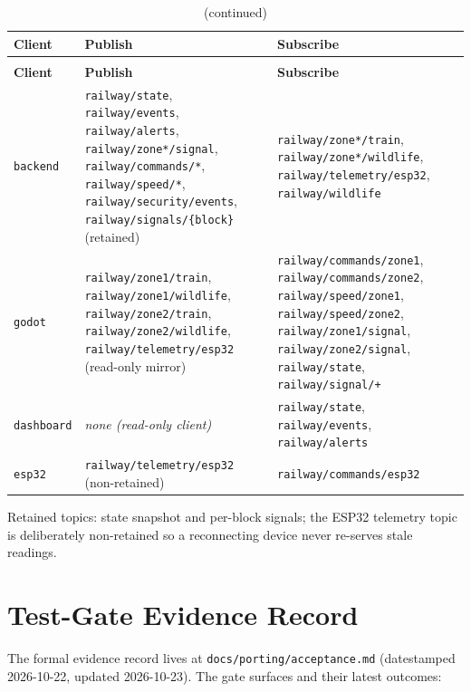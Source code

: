 \begin{longtable}{>{\raggedright}p{2.2cm} >{\raggedright\arraybackslash}p{6.6cm} >{\raggedright\arraybackslash}p{6.6cm}}
\caption{Per-client publish/subscribe matrix}\label{tab:acl-matrix}\\
\toprule
\textbf{Client} & \textbf{Publish} & \textbf{Subscribe} \\
\midrule
\endfirsthead
\caption[]{(continued)}\\
\toprule
\textbf{Client} & \textbf{Publish} & \textbf{Subscribe} \\
\midrule
\endhead
\texttt{backend} & \texttt{railway/state}, \texttt{railway/events},
\texttt{railway/alerts}, \texttt{railway/zone*/signal},
\texttt{railway/commands/*}, \texttt{railway/speed/*},
\texttt{railway/security/events}, \texttt{railway/signals/\{block\}}
(retained) & \texttt{railway/zone*/train},
\texttt{railway/zone*/wildlife}, \texttt{railway/telemetry/esp32},
\texttt{railway/wildlife} \\
\texttt{godot} & \texttt{railway/zone1/train},
\texttt{railway/zone1/wildlife}, \texttt{railway/zone2/train},
\texttt{railway/zone2/wildlife}, \texttt{railway/telemetry/esp32}
{\scriptsize(read-only mirror)} & \texttt{railway/commands/zone1},
\texttt{railway/commands/zone2}, \texttt{railway/speed/zone1},
\texttt{railway/speed/zone2}, \texttt{railway/zone1/signal},
\texttt{railway/zone2/signal}, \texttt{railway/state},
\texttt{railway/signal/+} \\
\texttt{dashboard} & {\em none (read-only client)} &
\texttt{railway/state}, \texttt{railway/events},
\texttt{railway/alerts} \\
\texttt{esp32} & \texttt{railway/telemetry/esp32} (non-retained) &
\texttt{railway/commands/esp32} \\
\bottomrule
\end{longtable}

\noindent Retained topics: state snapshot and per-block signals; the
ESP32 telemetry topic is deliberately non-retained so a reconnecting
device never re-serves stale readings.

\chapter{Test-Gate Evidence Record}\label{cha:appendix-gates}

The formal evidence record lives at \texttt{docs/porting/acceptance.md}
(datestamped 2026-10-22, updated 2026-10-23). The gate surfaces and
their latest outcomes:

